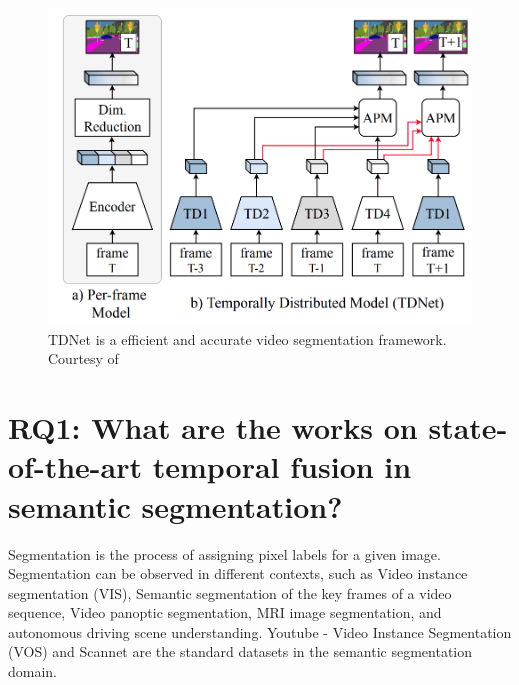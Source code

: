     \begin{figure}[h]
    	\centering
    	\includegraphics[width=12cm]{images/TDNet.png}
    	\caption{TDNet is a efficient and accurate video segmentation framework. Courtesy of \cite{78_hu2020temporally}}
    	\label{fig:TDNet}
    \end{figure}  
    
    \section{RQ1: What are the works on state-of-the-art temporal fusion in semantic segmentation?}
    
    Segmentation is the process of assigning pixel labels for a given image. Segmentation can be observed in different contexts, such as Video instance segmentation (VIS), Semantic segmentation of the key frames of a video sequence, Video panoptic segmentation, MRI image segmentation, and autonomous driving scene understanding. Youtube - Video Instance Segmentation (VOS) and Scannet are the standard datasets in the semantic segmentation domain. 
    
